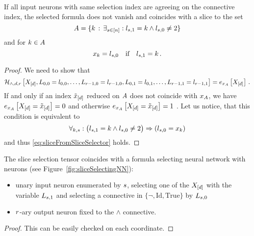 \begin{lemma}
    \label{lem:sliceFromSliceSelector}
    If all input neurons with same selection index are agreeing on the connective index, the selected formula does not vanish and coincides with a slice to the set
    \[ A = \{ k \, : \, \exists_{s\in[n]}: l_{s,1} = k \land l_{s,0} \neq 2 \} \]
    and for $k\in A$
    \[ x_{k} = l_{s,0} \quad \text{if} \quad l_{s,1} = k \, . \]
\end{lemma}
\begin{proof}
    We need to show that
    \begin{align}
        \label{eq:sliceFromSliceSelector}
        \mathcal{H}_{\land,d,r}\left[X_{[d]},L_{0,0}=l_{0,0},\ldots,L_{r-1,0}=l_{r-1,0},L_{0,1}=l_{0,1},\ldots,L_{r-1,1}=l_{r-1,1}\right] = e_{x_{A}}\left[X_{[d]}\right] \, .
    \end{align}
    If and only if an index $\tilde{x}_{[d]}$ reduced on $A$ does not coincide with $x_{A}$, we have $e_{x_{A}}\left[X_{[d]}=\tilde{x}_{[d]}\right]=0$ and otherwise $e_{x_{A}}\left[X_{[d]}=\tilde{x}_{[d]}\right]=1$ .
    Let us notice, that this condition is equivalent to
    \[ \forall_{k,s} : \big(  l_{s,1} = k \land l_{s,0} \neq 2 \big) \Rightarrow  (l_{s,0} = x_{k}) \]
    and thus \eqref{eq:sliceFromSliceSelector} holds.
\end{proof}


\begin{lemma}
    \label{lem:fsnnRepresentingSliceSelector}
    The slice selection tensor coincides with a formula selecting neural network with neurons (see Figure~\ref{fig:sliceSelectingNN}):
    \begin{itemize}
        \item unary input neuron enumerated by $s$, selecting one of the $X_{[d]}$ with the variable $L_{s,1}$ and selecting a connective in $\{\lnot, \mathrm{Id}, \mathrm{True}\}$ by $L_{s,0}$
        \item $r$-ary output neuron fixed to the $\land$ connective.
    \end{itemize}
\end{lemma}
\begin{proof}
    This can be easily checked on each coordinate.
\end{proof}

